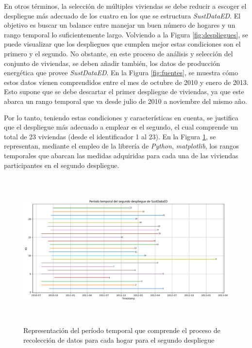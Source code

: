 \vspace{3mm}

En otros términos, la selección de múltiples viviendas se debe reducir a escoger el despliegue más adecuado de los cuatro en los que se estructura \textit{SustDataED}. El objetivo es buscar un balance entre manejar un buen número de hogares y un rango temporal lo suficientemente largo. Volviendo a la Figura \ref{fig:despliegues}, se puede visualizar que los despliegues que cumplen mejor estas condiciones son el primero y el segundo. No obstante, en este proceso de análisis y selección del conjunto de viviendas, se deben añadir también, los datos de producción energética que provee \textit{SustDataED}. En la Figura \ref{fig:fuentes}, se muestra cómo estos datos vienen comprendidos entre el mes de octubre de 2010 y enero de 2013. Esto supone que se debe descartar el primer despliegue de viviendas, ya que este abarca un rango temporal que va desde julio de 2010 a noviembre del mismo año.

\vspace{3mm}

Por lo tanto, teniendo estas condiciones y características en cuenta, se justifica que el despliegue más adecuado a emplear es el segundo, el cual comprende un total de 23 viviendas (desde el identificador 1 al 23). En la Figura \ref{fig:despliegue2}, se representan, mediante el empleo de la librería de \textit{Python}, \textit{matplotlib}, los rangos temporales que abarcan las medidas adquiridas para cada una de las viviendas participantes en el segundo despliegue.

\vspace{3mm}

\begin{figure}[h!]
    \centering
    \includegraphics[width=1\textwidth,height=8cm]{img/diseno/despliegue2.png}
    \caption{Representación del período temporal que comprende el proceso de recolección de datos para cada hogar para el segundo despliegue}
    \label{fig:despliegue2}
\end{figure}

